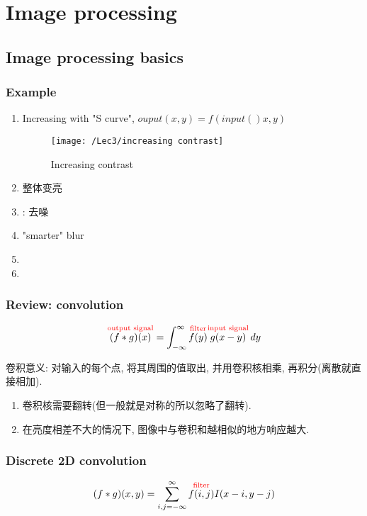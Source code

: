 \chapter{Image processing}
\section{Image processing basics}
\subsection{Example}
\begin{enumerate}
    \item Increasing  with "S curve", $ouput(x,y)=f(input()x,y)$
    \begin{figure}[H]
        \centering
        \texttt{[image: /Lec3/increasing contrast]}
        \caption{Increasing contrast}
    \end{figure}
    \item 整体变亮
    \item {}: 去噪
    \item "smarter" blur
    \item {}
    \item {}
\end{enumerate}
\subsection{Review: convolution}
\begin{align*}
    \overset{\textcolor{red}{\text{output signal}}}{(f*g)(x)}=\int_{-\infty }^{\infty}  \overset{\textcolor{red}{\text{filter}}}{f(y)}\overset{\textcolor{red}{\text{input signal}}}{g(x-y)}\,dy 
\end{align*}

卷积意义: 对输入的每个点,  将其周围的值取出, 并用卷积核相乘, 再积分(离散就直接相加). 

\begin{enumerate}
    \item 卷积核需要翻转(但一般就是对称的所以忽略了翻转). 
    \item 在亮度相差不大的情况下, 图像中与卷积和越相似的地方响应越大. 
\end{enumerate}

\subsection{Discrete 2D convolution}
\begin{align*}
    (f*g)(x,y)=\sum_{i,j=-\infty}^{\infty}\overset{\textcolor{red}{\text{filter}}}{f(i,j)}I(x-i,y-j)
\end{align*}

